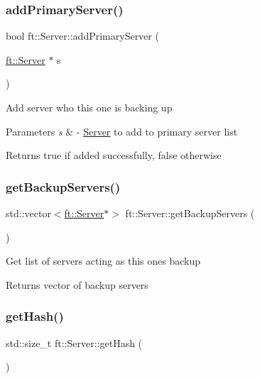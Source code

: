 \subsubsection{\texorpdfstring{add\+Primary\+Server()}{addPrimaryServer()}}
{\footnotesize\ttfamily bool ft\+::\+Server\+::add\+Primary\+Server (\begin{DoxyParamCaption}\item[{\mbox{\hyperlink{classft_1_1Server}{ft\+::\+Server}} $\ast$}]{s }\end{DoxyParamCaption})}

Add server who this one is backing up


\begin{DoxyParams}{Parameters}
{\em s} & -\/ \mbox{\hyperlink{classft_1_1Server}{Server}} to add to primary server list\\
\hline
\end{DoxyParams}
\begin{DoxyReturn}{Returns}
true if added successfully, false otherwise 
\end{DoxyReturn}
\mbox{\label{classft_1_1Server_a97e94c9e9c8ed5eb8282564f1d2db739}} 
\subsubsection{\texorpdfstring{get\+Backup\+Servers()}{getBackupServers()}}
{\footnotesize\ttfamily std\+::vector$<$\mbox{\hyperlink{classft_1_1Server}{ft\+::\+Server}}$\ast$$>$ ft\+::\+Server\+::get\+Backup\+Servers (\begin{DoxyParamCaption}{ }\end{DoxyParamCaption})\hspace{0.3cm}{\ttfamily [inline]}}

Get list of servers acting as this one\textquotesingle{}s backup

\begin{DoxyReturn}{Returns}
vector of backup servers 
\end{DoxyReturn}
\mbox{\label{classft_1_1Server_aef123896c2f84d6bc2c5fe2940d1a8b4}} 
\subsubsection{\texorpdfstring{get\+Hash()}{getHash()}}
{\footnotesize\ttfamily std\+::size\+\_\+t ft\+::\+Server\+::get\+Hash (\begin{DoxyParamCaption}{ }\end{DoxyParamCaption})}

